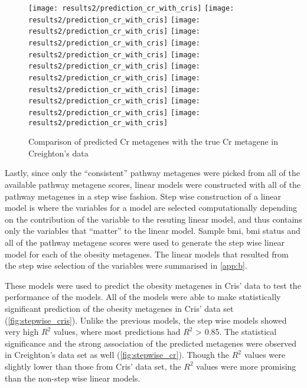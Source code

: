 \begin{figure}[htpb]
	\centering
	\texttt{[image: results2/prediction\_cr\_with\_cris]}
	\texttt{[image: results2/prediction\_cr\_with\_cris]}
	\texttt{[image: results2/prediction\_cr\_with\_cris]}
	\texttt{[image: results2/prediction\_cr\_with\_cris]}
	\texttt{[image: results2/prediction\_cr\_with\_cris]}
	\texttt{[image: results2/prediction\_cr\_with\_cris]}
	\texttt{[image: results2/prediction\_cr\_with\_cris]}
	\texttt{[image: results2/prediction\_cr\_with\_cris]}
	\texttt{[image: results2/prediction\_cr\_with\_cris]}
	\texttt{[image: results2/prediction\_cr\_with\_cris]}
	\texttt{[image: results2/prediction\_cr\_with\_cris]}
	\caption{Comparison of predicted Cr metagenes with the true Cr metagene in Creighton's data}
	\label{fig:predict_cr_cris}
\end{figure}

\noindent
Lastly, since only the ``consistent'' pathway metagenes were picked from all of the available pathway metagene scores, linear models were constructed with all of the pathway metagenes in a step wise fashion.
Step wise construction of a linear model is where the variables for a model are selected computationally depending on the contribution of the variable to the resuting linear model, and thus contains only the variables that ``matter'' to the linear model.
Sample \gls{bmi}, \gls{bmi} status and all of the pathway metagene scores were used to generate the step wise linear model for each of the obesity metagenes.
The linear models that resulted from the step wise selection of the variables were summarised in \cref{app:b}.

These models were used to predict the obesity metagenes in Cris' data to test the performance of the models.
All of the models were able to make statistically significant prediction of the obesity metagenes in Cris' data set (\cref{fig:stepwise_cris}).
Unlike the previous models, the step wise models showed very high $R^2$ values, where most predictions had $R^2$ \textgreater{} 0.85.
The statistical significance and the strong association of the predicted metagenes were observed in Creighton's data set as well (\cref{fig:stepwise_cr}).
Though the $R^2$ values were slightly lower than those from Cris' data set, the $R^2$ values were more promising than the non-step wise linear models.


